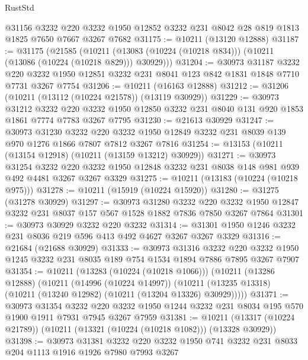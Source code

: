 \begin{lexlean}{RustStd}
\begin{coremodule}
{\begin{coremodule}
{{{{{{{{{{{{{{{{{{{{{{{{{    @31156
    @3232
    @220
    @3232
    @1950
    @12852
    @3232
    @231
    @8042
    @28
    @819
    @1813
    @1825
    @7650
    @7667
    @3267
    @7682
@31175 := @10211 (@13120 @12888)
@31187 := @31175
    (@21585
      (@10211 (@13083 (@10224 (@10218 @834))) (@10211 (@13086 (@10224 (@10218 @829))) @30929)))
@31204 := @30973
    @31187
    @3232
    @220
    @3232
    @1950
    @12851
    @3232
    @231
    @8041
    @123
    @842
    @1831
    @1848
    @7710
    @7731
    @3267
    @7754
@31206 := @10211 (@16163 @12888)
@31212 := @31206 (@10211 (@13112 (@10224 @21578)) (@13119 @30929))
@31229 := @30973
    @31212
    @3232
    @220
    @3232
    @1950
    @12850
    @3232
    @231
    @8040
    @131
    @920
    @1853
    @1861
    @7774
    @7783
    @3267
    @7795
@31230 := @21613 @30929
@31247 := @30973
    @31230
    @3232
    @220
    @3232
    @1950
    @12849
    @3232
    @231
    @8039
    @139
    @970
    @1276
    @1866
    @7807
    @7812
    @3267
    @7816
@31254 := @13153 (@10211 (@13154 @12918) (@10211 (@13159 @13212) @30929))
@31271 := @30973
    @31254
    @3232
    @220
    @3232
    @1950
    @12848
    @3232
    @231
    @8038
    @148
    @981
    @939
    @492
    @4481
    @3267
    @3267
    @3329
@31275 := @10211 (@13183 (@10224 (@10218 @975)))
@31278 := @10211 (@15919 (@10224 @15920))
@31280 := @31275 (@31278 @30929)
@31297 := @30973
    @31280
    @3232
    @220
    @3232
    @1950
    @12847
    @3232
    @231
    @8037
    @157
    @567
    @1528
    @1882
    @7836
    @7850
    @3267
    @7864
@31301 := @30973 @30929 @3232 @220 @3232
@31314 := @31301 @1950 @1246 @3232 @231 @8036 @219 @596 @413 @492 @4627 @3267 @3267 @3329
@31316 := @21684 (@21688 @30929)
@31333 := @30973
    @31316
    @3232
    @220
    @3232
    @1950
    @1245
    @3232
    @231
    @8035
    @189
    @754
    @1534
    @1894
    @7886
    @7895
    @3267
    @7907
@31354 := @10211
    (@13283 (@10224 (@10218 @1066)))
    (@10211
      (@13286 @12888)
      (@10211
        (@14996 (@10224 @14997))
        (@10211 (@13235 @13318) (@10211 (@13240 @12982) (@10211 (@13204 @13326) @30929)))))
@31371 := @30973
    @31354
    @3232
    @220
    @3232
    @1950
    @1244
    @3232
    @231
    @8034
    @195
    @570
    @1900
    @1911
    @7931
    @7945
    @3267
    @7959
@31381 := @10211 (@13317 (@10224 @21789)) (@10211 (@13321 (@10224 (@10218 @1082))) (@13328 @30929))
@31398 := @30973
    @31381
    @3232
    @220
    @3232
    @1950
    @741
    @3232
    @231
    @8033
    @204
    @1113
    @1916
    @1926
    @7980
    @7993
    @3267
}}}}}}}}}}}}}}}}}}}}}}}}}
\end{coremodule}}
\end{coremodule}
\end{lexlean}
